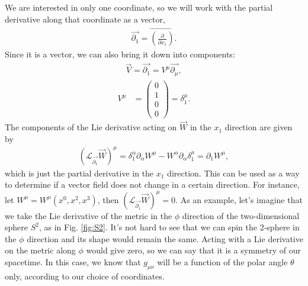 \documentclass[10pt]{article}
\begin{document}
    We are interested in only one coordinate, so we will work with the partial derivative along that coordinate as a vector,
    \begin{align}
    \vec{\partial_1} = \vec{\left( \frac{\partial}{\partial x_1} \right)}.
    \end{align}
    Since it is a vector, we can also bring it down into components:
    \begin{align}
    \vec{V} = \vec{\partial_1} = V^{\mu} \vec{\partial_{\mu}},
    \end{align}
    \begin{align}
        V^{\mu} &= \begin{pmatrix}
               0 \\
               1 \\
               0 \\
               0
             \end{pmatrix} =  \delta_1^{\mu}.
    \end{align}
    The components of the Lie derivative acting on $\vec{W}$ in the $x_1$ direction are given by
    \begin{align}
        \left(\mathcal{L}_{\vec{\partial_1}} \vec{W} \right)^{\mu} = \delta_1^{\alpha} \partial_{\alpha} W^{\mu} - W^{\alpha} \partial_{\alpha} \delta_1^{\mu} = \partial_1 W^{\mu},
    \end{align}
    which is just the partial derivative in the $x_1$ direction. This can be used as a way to determine if a vector field does not change in a certain direction. For instance, let $W^{\mu} = W^{\mu}(x^0,x^2,x^3)$, then $\left( \mathcal{L}_{\vec{\partial_1}} \vec{W} \right)^{\mu} = 0$. 
    As an example, let's imagine that we take the Lie derivative of the metric in the $\phi$ direction of the two-dimensional sphere $S^2$, as in Fig. \ref{fig:S2}. It's not hard to see that we can spin the 2-sphere in the $\phi$ direction and its shape would remain the same. Acting with a Lie derivative on the metric along $\phi$ would give zero, so we can say that it is a symmetry of our spacetime. In this case, we know that $g_{\mu \nu}$ will be a function of the polar angle $\theta$ only, according to our choice of coordinates.
    
\end{document}
